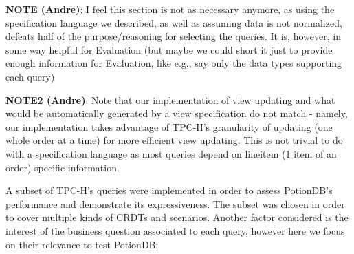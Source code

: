 \documentclass[sigplan,review,anonymous]{acmart}
\begin{document}
\textbf{NOTE (Andre)}: I feel this section is not as necessary anymore, as using the specification language we described, as well as assuming data is not normalized, defeats half of the purpose/reasoning for selecting the queries. It is, however, in some way helpful for Evaluation (but maybe we could short it just to provide enough information for Evaluation, like e.g., say only the data types supporting each query)

\textbf{NOTE2 (Andre)}: Note that our implementation of view updating and what would be automatically generated by a view specification do not match - namely, our implementation takes advantage of TPC-H's granularity of updating (one whole order at a time) for more efficient view updating. This is not trivial to do with a specification language as most queries depend on lineitem (1 item of an order) specific information.

A subset of TPC-H's queries were implemented in order to assess PotionDB's performance and demonstrate its expressiveness.
The subset was chosen in order to cover multiple kinds of CRDTs and scenarios.
Another factor considered is the interest of the business question associated to each query, however here we focus on their relevance to test PotionDB:
\end{document}
